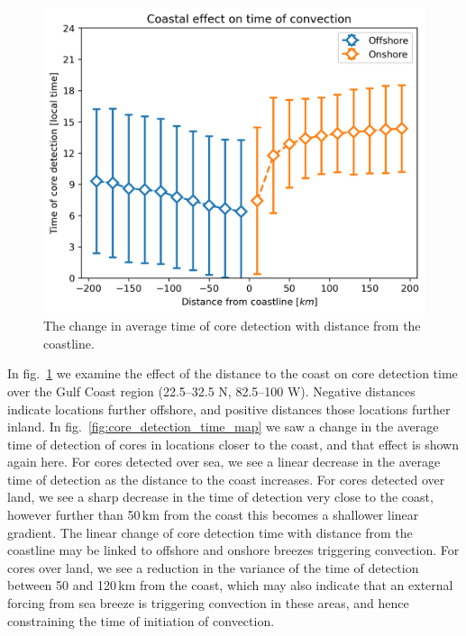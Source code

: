 \begin{figure}[tp]
    \centering
    \includegraphics[width=\textwidth]{figures/ch2_coastal_effect.png}
    \caption[
    The change in average time of core detection with distance from the coastline
    ]{
    The change in average time of core detection with distance from the coastline.
    }
    \label{fig:core_coast_effect}
\end{figure}

In fig.~\ref{fig:core_coast_effect} we examine the effect of the distance to the coast on core detection time over the Gulf Coast region (22.5--32.5\,\textdegree\,N, 82.5--100\,\textdegree\,W).
Negative distances indicate locations further offshore, and positive distances those locations further inland.
In fig.~\ref{fig:core_detection_time_map} we saw a change in the average time of detection of cores in locations closer to the coast, and that effect is shown again here.
For cores detected over sea, we see a linear decrease in the average time of detection as the distance to the coast increases.
For cores detected over land, we see a sharp decrease in the time of detection very close to the coast, however further than 50\,\unit{km} from the coast this becomes a shallower linear gradient.
The linear change of core detection time with distance from the coastline may be linked to offshore and onshore breezes triggering convection.
For cores over land, we see a reduction in the variance of the time of detection between 50 and 120\,\unit{km} from the coast, which may also indicate that an external forcing from sea breeze is triggering convection in these areas, and hence constraining the time of initiation of convection.

